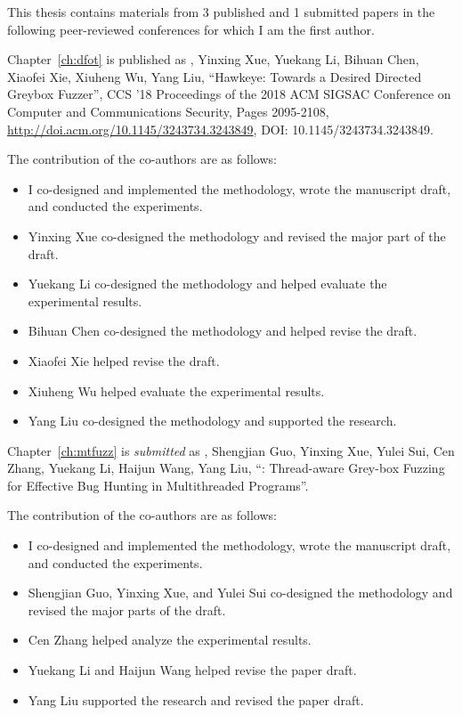 \noindent This thesis contains materials from 3 published and 1 submitted papers in the following peer-reviewed conferences for which I am the first author.

\noindent Chapter~\ref{ch:dfot} is published as \myname, Yinxing Xue, Yuekang Li, Bihuan Chen, Xiaofei Xie, Xiuheng Wu, Yang Liu, ``Hawkeye: Towards a Desired Directed Greybox Fuzzer'', CCS '18 Proceedings of the 2018 ACM SIGSAC Conference on Computer and Communications Security, Pages 2095-2108, \url{http://doi.acm.org/10.1145/3243734.3243849}, DOI: 10.1145/3243734.3243849.

\noindent The contribution of the co-authors are as follows:
\begin{itemize}
	\item I co-designed and implemented the methodology, wrote the manuscript draft, and conducted the experiments.
	\item Yinxing Xue co-designed the methodology and revised the major part of the draft.
	\item Yuekang Li co-designed the methodology and helped evaluate the experimental results.
	\item Bihuan Chen co-designed the methodology and helped revise the draft.
	\item Xiaofei Xie helped revise the draft.
	\item Xiuheng Wu helped evaluate the experimental results.
	\item Yang Liu co-designed the methodology and supported the research.
\end{itemize}

\noindent Chapter~\ref{ch:mtfuzz} is \emph{submitted} as \myname, Shengjian Guo, Yinxing Xue, Yulei Sui, Cen Zhang, Yuekang Li, Haijun Wang, Yang Liu, ``\mtfuzz: Thread-aware Grey-box Fuzzing for Effective Bug Hunting in Multithreaded Programs''.

\noindent The contribution of the co-authors are as follows:
\begin{itemize}
	\item I co-designed and implemented the methodology, wrote the manuscript draft, and conducted the experiments.
	\item Shengjian Guo, Yinxing Xue, and Yulei Sui co-designed the methodology and revised the major parts of the draft.
	\item Cen Zhang helped analyze the experimental results.
	\item Yuekang Li and Haijun Wang helped revise the paper draft.
	\item Yang Liu supported the research and revised the paper draft.
\end{itemize}

